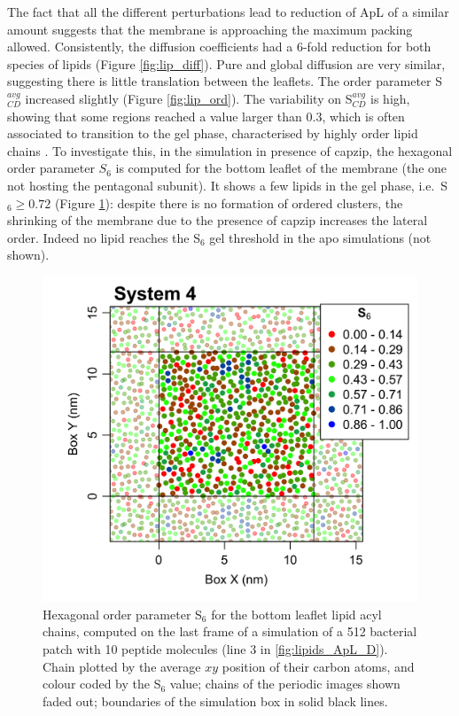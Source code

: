 The fact that all the different perturbations lead to reduction of ApL of a similar amount suggests that the membrane is approaching the maximum packing allowed.
%
Consistently, the diffusion coefficients had a 6-fold reduction for both species of lipids (Figure \ref{fig:lip_diff}). Pure and global diffusion are very similar, suggesting there is little translation between the leaflets.
%
The order parameter S$^{avg}_{CD}$ increased slightly (Figure \ref{fig:lip_ord}). The variability on S$^{avg}_{CD}$ is high, showing that some regions reached a value larger than 0.3, which is often associated to transition to the gel phase, characterised by highly order lipid chains \citep{Pluhackova2016}.
%
To investigate this, in the simulation in presence of capzip, the hexagonal order parameter $S_6$ is computed for the bottom leaflet of the membrane (the one not hosting the pentagonal subunit). It shows a few lipids in the gel phase, i.e.\ S$_6 \ge 0.72$ (Figure \ref{fig:S6_pb4}): despite there is no formation of ordered clusters, the shrinking of the membrane due to the presence of capzip increases the lateral order. Indeed no lipid reaches the S$_6$ gel threshold in the apo simulations (not shown).
%
\begin{figure}[h!]
\centering
\includegraphics[width=0.5\linewidth]{3results_capsule/pics/pb4_S6.png} 
\caption[Hexagonal order parameter of lipids in protein-lipid simulation]{Hexagonal order parameter S$_6$ for the bottom leaflet lipid acyl chains, computed on the last frame of a simulation of a 512 bacterial patch with 10 peptide molecules (line 3 in \ref{fig:lipids_ApL_D}). Chain plotted by the average $xy$ position of their carbon atoms, and colour coded by the S$_6$ value; chains of the periodic images shown faded out; boundaries of the simulation box in solid black lines.}
\label{fig:S6_pb4}
\end{figure}

